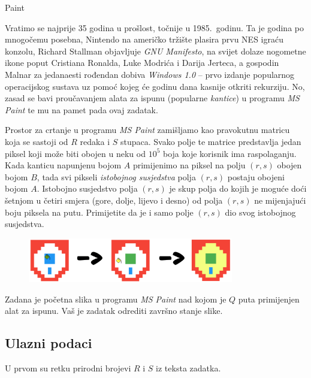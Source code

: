 \begin{statement}[
  problempoints=100,
  timelimit=3 sekunde,
  memorylimit=512 MiB,
]{Paint}

Vratimo se najprije 35 godina u prošlost, točnije u 1985.\ godinu. Ta je godina
po mnogočemu posebna, Nintendo na američko tržište plasira prvu NES igraću
konzolu, Richard Stallman objavljuje \textit{GNU Manifesto}, na svijet dolaze
nogometne ikone poput Cristiana Ronalda, Luke Modrića i Darija Jerteca, a
gospodin Malnar za jedanaesti rođendan dobiva \textit{Windows 1.0} -- prvo
izdanje popularnog operacijskog sustava uz pomoć kojeg će godinu dana kasnije
otkriti rekurziju. No, zasad se bavi proučavanjem alata za ispunu (popularne
\textit{kantice}) u programu \textit{MS Paint} te mu na pamet pada ovaj zadatak.

Prostor za crtanje u programu \textit{MS Paint} zamišljamo kao pravokutnu
matricu koja se sastoji od $R$ redaka i $S$ stupaca. Svako polje te matrice
predstavlja jedan piksel koji može biti obojen u neku od $10^5$ boja koje
korisnik ima raspolaganju. Kada kanticu napunjenu bojom $A$ primijenimo na
piksel na polju $(r, s)$ obojen bojom $B$, tada svi pikseli
\textit{istobojnog susjedstva} polja $(r, s)$ postaju obojeni bojom $A$.
Istobojno susjedstvo polja $(r, s)$ je skup polja do kojih je moguće doći
šetnjom u četiri smjera (gore, dolje, lijevo i desno) od polja $(r, s)$ ne
mijenjajući boju piksela na putu. Primijetite da je i samo polje $(r, s)$ dio
svog istobojnog susjedstva.

\begin{figure}[H]
\centering
\includegraphics[width=0.8\textwidth]{img/paint_skica.png}
\end{figure}


Zadana je početna slika u programu \textit{MS Paint} nad kojom je $Q$ puta
primijenjen alat za ispunu. Vaš je zadatak odrediti završno stanje slike.

\subsection*{Ulazni podaci}
U prvom su retku prirodni brojevi $R$ i $S$ iz teksta zadatka.


\end{statement}
